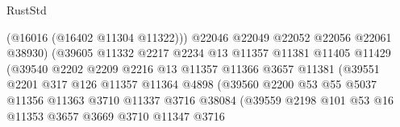 \begin{lexlean}{RustStd}
\begin{coremodule}
                                        (@16016 (@16402 @11304 @11322)))
                                      @22046
                                      @22049
                                      @22052
                                      @22056
                                      @22061
                                      @38930)
                                    (@39605
                                      @11332
                                      @2217
                                      @2234
                                      @13
                                      @11357
                                      @11381
                                      @11405
                                      @11429
                                      (@39540
                                        @2202
                                        @2209
                                        @2216
                                        @13
                                        @11357
                                        @11366
                                        @3657
                                        @11381
                                        (@39551
                                          @2201
                                          @317
                                          @126
                                          @11357
                                          @11364
                                          @4898
                                          (@39560
                                            @2200
                                            @53
                                            @55
                                            @5037
                                            @11356
                                            @11363
                                            @3710
                                            @11337
                                            @3716
                                            @38084
                                            (@39559
                                              @2198
                                              @101
                                              @53
                                              @16
                                              @11353
                                              @3657
                                              @3669
                                              @3710
                                              @11347
                                              @3716

\end{coremodule}
\end{lexlean}
